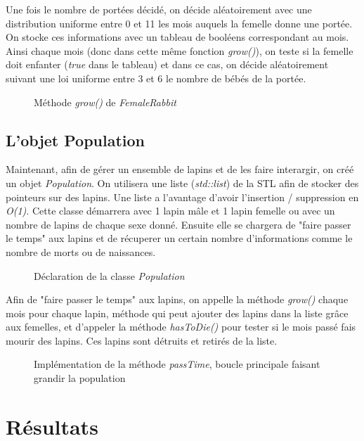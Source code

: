 \documentclass{article}
\begin{document}
\newpage
Une fois le nombre de portées décidé, on décide aléatoirement avec une distribution uniforme
entre 0 et 11 les mois auquels la femelle donne une portée. On stocke ces informations avec
un tableau de booléens correspondant au mois. Ainsi chaque mois (donc dans cette même fonction
\emph{grow()}), on teste si la femelle doit enfanter (\emph{true} dans le tableau) et dans ce
cas, on décide aléatoirement suivant une loi uniforme entre 3 et 6 le nombre de bébés de la portée.

\begin{figure}[!h]
  \caption{Méthode \emph{grow()} de \emph{FemaleRabbit}}
  
\end{figure}

\subsection{L'objet Population}
Maintenant, afin de gérer un ensemble de lapins et de les faire interargir, on créé
un objet \emph{Population}. On utilisera une liste (\emph{std::list}) de la STL afin
de stocker des pointeurs sur des lapins. Une liste a l'avantage d'avoir l'insertion /
suppression en \emph{O(1)}. Cette classe démarrera avec 1 lapin mâle et 1 lapin femelle ou avec
un nombre de lapins de chaque sexe donné. Ensuite elle se chargera de "faire passer le temps"
aux lapins et de récuperer un certain nombre d'informations comme le nombre de morts ou de
naissances.

\begin{figure}[!h]
  \caption{Déclaration de la classe \emph{Population}}
  
\end{figure}


Afin de "faire passer le temps" aux lapins, on appelle la méthode \emph{grow()} chaque mois
pour chaque lapin, méthode qui peut ajouter des lapins dans la liste grâce aux femelles, et
d'appeler la méthode \emph{hasToDie()} pour tester si le mois passé fais mourir des lapins.
Ces lapins sont détruits et retirés de la liste.

\begin{figure}[!h]
  \caption{Implémentation de la méthode \emph{passTime}, boucle principale faisant grandir la population}
  
\end{figure}

\newpage
\section{Résultats}
\end{document}
